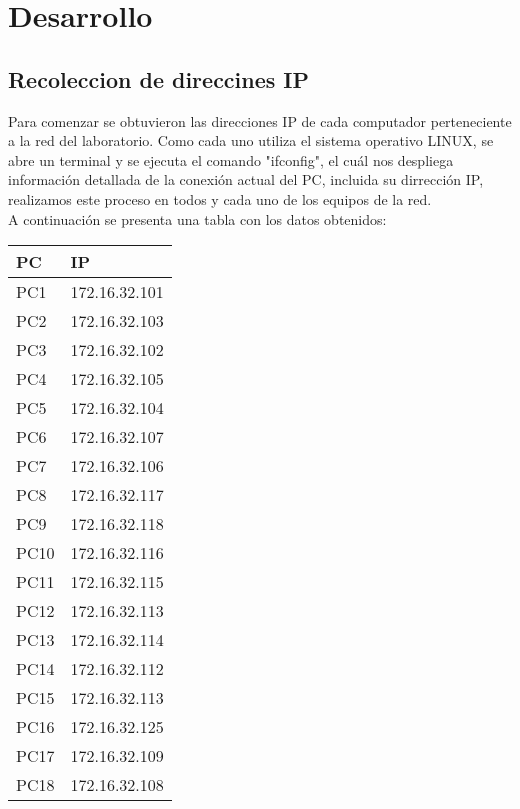 \documentclass[spanish]{udpreport}
\begin{document}
\chapter{Desarrollo}

\section{Recoleccion de direccines IP}

Para comenzar se obtuvieron las direcciones IP de cada computador perteneciente a la red del laboratorio. Como cada uno utiliza el sistema operativo LINUX, se abre un terminal y se ejecuta el comando "ifconfig", el cuál nos despliega información detallada de la conexión actual del PC, incluida su dirrección IP, realizamos este proceso en todos y cada uno de los equipos de la red.\\

A continuación se presenta una tabla con los datos obtenidos:
\vspace{2cm}
\begin{table}[htbp]
\begin{center}
\begin{tabular}{|l|l|}
\hline
PC & IP \\
\hline \hline
PC1 & 172.16.32.101 \\ \hline
PC2 & 172.16.32.103 \\ \hline
PC3 & 172.16.32.102 \\ \hline
PC4 & 172.16.32.105 \\ \hline
PC5 & 172.16.32.104 \\ \hline
PC6 & 172.16.32.107 \\ \hline
PC7 & 172.16.32.106 \\ \hline
PC8 & 172.16.32.117 \\ \hline
PC9 & 172.16.32.118 \\ \hline
PC10 & 172.16.32.116 \\ \hline
PC11 & 172.16.32.115 \\ \hline
PC12 & 172.16.32.113 \\ \hline
PC13 & 172.16.32.114 \\ \hline
PC14 & 172.16.32.112 \\ \hline
PC15 & 172.16.32.113 \\ \hline
PC16 & 172.16.32.125 \\ \hline
PC17 & 172.16.32.109 \\ \hline
PC18 & 172.16.32.108 \\ \hline
\end{tabular}
\label{tabla:sencilla}
\end{center}
\end{table}
\vspace{14cm}
\end{document}
